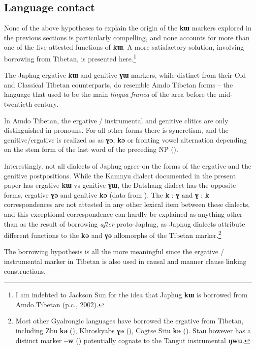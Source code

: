 \documentclass[oldfontcommands,oneside,a4paper,11pt]{article}
\newcommand{\ipa}[1]{{\phon\textbf{#1}}}
\begin{document}
\subsection{Language contact} \label{sec:contact}
None of the above hypotheses to explain the origin of the \ipa{kɯ} markers explored in the previous sections is particularly compelling, and none  accounts for more than one of the five attested functions of \ipa{kɯ}. A more satisfactory solution, involving borrowing from Tibetan, is presented here.\footnote{I am indebted to Jackson Sun for the idea that Japhug \ipa{kɯ} is borrowed from Amdo Tibetan (p.c., 2002). }

The Japhug ergative \ipa{kɯ} and genitive \ipa{ɣɯ} markers, while distinct from their Old and Classical Tibetan counterparts, do resemble Amdo Tibetan forms -- the language that used to be the main \textit{lingua franca} of the area before the mid-twentieth century.

In Amdo Tibetan, the ergative / instrumental and genitive clitics are only distinguished in pronouns. For all other forms there is syncretism, and the genitive/ergative is realized as as \ipa{ɣə}, \ipa{kə} or fronting vowel alternation depending on the stem form of the last word of the preceding NP (\citealt[62]{haller04themchen}). 

Interestingly, not all dialects of Japhug agree on the forms of the ergative and the genitive postpositions. While the Kamnyu dialect documented in the present paper has ergative \ipa{kɯ} vs genitive \ipa{ɣɯ}, the Datshang dialect has the opposite forms, ergative \ipa{ɣə} and genitive \ipa{kə} (data from \citealt[63-4]{lin11direction}). The \ipa{k} : \ipa{ɣ } and \ipa{ɣ} : \ipa{k} correspondences are not attested in any other lexical item between these dialects, and this exceptional correspondence can hardly be explained as anything other than as the result of borrowing \textit{after} proto-Japhug,  as Japhug dialects attribute  different functions to the \ipa{kə} and \ipa{ɣə} allomorphs of the Tibetan marker.\footnote{Most other Gyalrongic languages have borrowed the ergative from Tibetan, including Zbu \ipa{kə} (\citealt{gongxun14agreement}), Khroskyabs \ipa{ɣə} (\citealt[36]{lai13affixale}), Cogtse Situ \ipa{kə}  (\citealt[336]{linxr93jiarong}). Stau however has a distinct marker \ipa{--w} (\citealt{jacques14rtau}) potentially cognate to the Tangut instrumental \ipa{ŋwu}.}
 
The borrowing hypothesis is all the more meaningful since the ergative / instrumental marker in Tibetan is also used in causal and manner clause linking constructions. 
\end{document}
